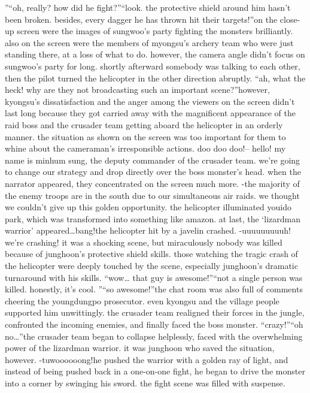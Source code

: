”“oh, really? how did he fight?”“look.
 the protective shield around him hasn’t been broken.
 besides, every dagger he has thrown hit their targets!”on the close-up screen were the images of sungwoo’s party fighting the monsters brilliantly.
 also on the screen were the members of myongsu’s archery team who were just standing there, at a loss of what to do.
however, the camera angle didn’t focus on sungwoo’s party for long.
 shortly afterward somebody was talking to each other, then the pilot turned the helicopter in the other direction abruptly.
“ah, what the heck! why are they not broadcasting such an important scene?”however, kyongsu’s dissatisfaction and the anger among the viewers on the screen didn’t last long because they got carried away with the magnificent appearance of the raid boss and the crusader team getting aboard the helicopter in an orderly manner.
the situation as shown on the screen was too important for them to whine about the cameraman’s irresponsible actions.
doo doo doo!– hello! my name is minhum sung, the deputy commander of the crusader team.
 we’re going to change our strategy and drop directly over the boss monster’s head.
when the narrator appeared, they concentrated on the screen much more.
-the majority of the enemy troops are in the south due to our simultaneous air raids.
 we thought we couldn’t give up this golden opportunity.
the helicopter illuminated youido park, which was transformed into something like amazon.
 at last, the ‘lizardman warrior’ appeared…bang!the helicopter hit by a javelin crashed.
-uuuuuuuuuh! we’re crashing!
it was a shocking scene, but miraculously nobody was killed because of junghoon’s protective shield skills.
 those watching the tragic crash of the helicopter were deeply touched by the scene, especially junghoon’s dramatic turnaround with his skills.
“wow… that guy is awesome!”“not a single person was killed.
 honestly, it’s cool.
”“so awesome!”the chat room was also full of comments cheering the youngdungpo prosecutor.
 even kyongsu and the village people supported him unwittingly.
the crusader team realigned their forces in the jungle, confronted the incoming enemies, and finally faced the boss monster.
“crazy!”“oh no…”the crusader team began to collapse helplessly, faced with the overwhelming power of the lizardman warrior.
it was junghoon who saved the situation, however.
-tuwoooooong!he pushed the warrior with a golden ray of light, and instead of being pushed back in a one-on-one fight, he began to drive the monster into a corner by swinging his sword.
 the fight scene was filled with suspense.
